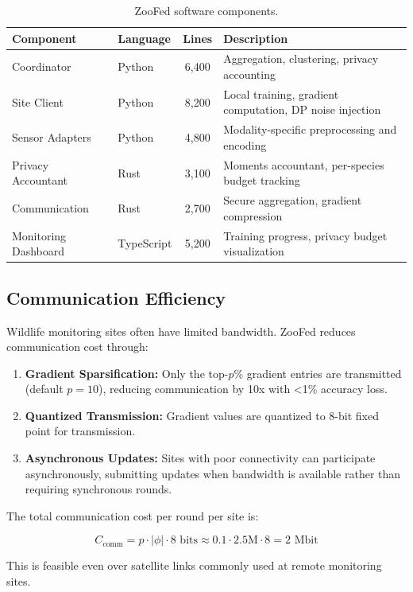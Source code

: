 \begin{table}[H]
\centering
\caption{ZooFed software components.}
\label{tab:software}
\begin{tabularx}{\textwidth}{@{}llcX@{}}
\toprule
\textbf{Component} & \textbf{Language} & \textbf{Lines} & \textbf{Description} \\
\midrule
Coordinator & Python & 6,400 & Aggregation, clustering, privacy accounting \\
Site Client & Python & 8,200 & Local training, gradient computation, DP noise injection \\
Sensor Adapters & Python & 4,800 & Modality-specific preprocessing and encoding \\
Privacy Accountant & Rust & 3,100 & Moments accountant, per-species budget tracking \\
Communication & Rust & 2,700 & Secure aggregation, gradient compression \\
Monitoring Dashboard & TypeScript & 5,200 & Training progress, privacy budget visualization \\
\bottomrule
\end{tabularx}
\end{table}

\subsection{Communication Efficiency}

Wildlife monitoring sites often have limited bandwidth.
ZooFed reduces communication cost through:

\begin{enumerate}[leftmargin=*]
    \item \textbf{Gradient Sparsification:} Only the top-$p\%$ gradient entries are transmitted (default $p=10$), reducing communication by 10x with <1\% accuracy loss.
    \item \textbf{Quantized Transmission:} Gradient values are quantized to 8-bit fixed point for transmission.
    \item \textbf{Asynchronous Updates:} Sites with poor connectivity can participate asynchronously, submitting updates when bandwidth is available rather than requiring synchronous rounds.
\end{enumerate}

The total communication cost per round per site is:

\begin{equation}
    C_{\text{comm}} = p \cdot |\phi| \cdot 8 \text{ bits} \approx 0.1 \cdot 2.5\text{M} \cdot 8 = 2 \text{ Mbit}
\end{equation}

This is feasible even over satellite links commonly used at remote monitoring sites.

